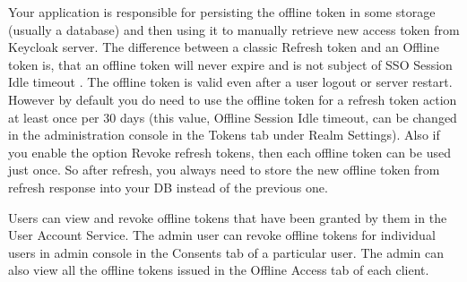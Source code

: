 Your application is responsible for persisting the offline token in some storage (usually a database) and then using it to manually retrieve new access token from Keycloak server.
The difference between a classic Refresh token and an Offline token is, that an offline token will never expire and is not subject of SSO Session Idle timeout . The offline token is valid even after a user logout or server restart. However by default you do need to use the offline token for a refresh token action at least once per 30 days (this value, Offline Session Idle timeout, can be changed in the administration console in the Tokens tab under Realm Settings). Also if you enable the option Revoke refresh tokens, then each offline token can be used just once. So after refresh, you always need to store the new offline token from refresh response into your DB instead of the previous one.

Users can view and revoke offline tokens that have been granted by them in the User Account Service. The admin user can revoke offline tokens for individual users in admin console in the Consents tab of a particular user. The admin can also view all the offline tokens issued in the Offline Access tab of each client.